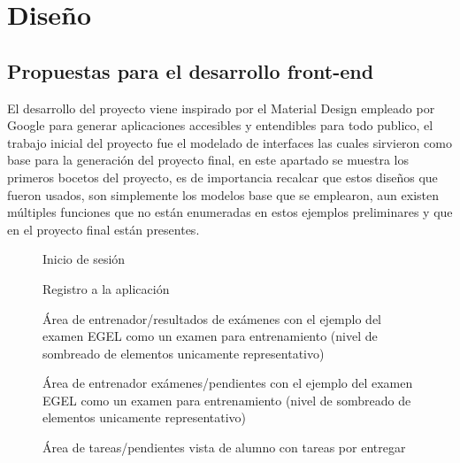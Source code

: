 \documentclass[12pt]{book}
\begin{document}
\begin{enumerate}
\begin{itemize}
    	\end{itemize}
    	
    	\chapter{Diseño}
    	\section{Propuestas para el desarrollo front-end}
    	{\normalsize El desarrollo del proyecto viene inspirado por el Material Design empleado por Google para generar aplicaciones accesibles y entendibles para todo publico, el trabajo inicial del proyecto fue el modelado de interfaces las cuales sirvieron como base para la generación del proyecto final, en este apartado se muestra los primeros bocetos del proyecto, es de importancia recalcar que estos diseños que fueron usados, son simplemente los modelos base que se emplearon, aun existen múltiples funciones que no están enumeradas en estos ejemplos preliminares y que en el proyecto final están presentes.}
    	\begin{figure} [h]
    		\centering
    		\caption{Inicio de sesión}
    		\label{fig:mk1}
    	\end{figure}
    	\pagebreak
    	
    	\begin{figure} [t]
    		\centering
    		\caption{Registro a la aplicación}
    		\label{fig:mk1}
    	\end{figure}
	    \begin{figure} [t]
	    	\centering
	    	\caption{Área de entrenador/resultados de exámenes con el ejemplo del examen EGEL como un examen para entrenamiento (nivel de sombreado de elementos unicamente representativo)}
	    	\label{fig:mk1}
	    \end{figure}
    	\begin{figure} [t]
    		\centering
    		\caption{Área de entrenador exámenes/pendientes con el ejemplo del examen EGEL como un examen para entrenamiento (nivel de sombreado de elementos unicamente representativo)}
    		\label{fig:mk1}
    	\end{figure}
    	\begin{figure} [t]
    		\centering
    		\caption{Área de tareas/pendientes vista de alumno con tareas por entregar}
    		\label{fig:mk1}
    	\end{figure}
    
    	


    
	\end{enumerate}
	\backmatter
\end{document}
